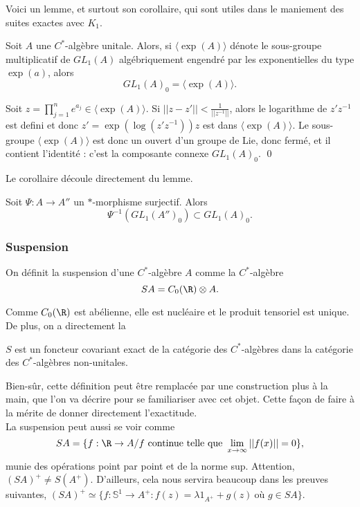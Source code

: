 Voici un lemme, et surtout son corollaire, qui sont utiles dans le maniement des suites exactes avec $K_1$.

\begin{lem}
Soit $A$ une $C^*$-algèbre unitale. Alors, si $\langle \exp(A)\rangle$ dénote le sous-groupe multiplicatif de $GL_1(A)$ algébriquement engendré par les exponentielles du type $\exp(a)$, alors
\[GL_1(A)_0 = \langle \exp(A)\rangle. \]
\end{lem}

\begin{dem}
Soit $z=\prod_{j=1}^n e^{a_j}\in \langle \exp(A)\rangle$. Si $||z-z'||<\frac{1}{||z^{-1}||}$, alors le logarithme de $z'z^{-1}$ est defini et donc 
$z'=\exp(\log(z'z^{-1}) ) z $ est dans $\langle \exp(A)\rangle$. Le sous-groupe $\langle \exp(A)\rangle$ est donc un ouvert d'un groupe de Lie, donc fermé, et il contient l'identité : c'est la composante connexe $GL_1(A)_0$.
\qed
\end{dem}
Le corollaire découle directement du lemme.
\begin{cor} Soit $\Psi : A\rightarrow A''$ un $*$-morphisme surjectif. Alors \[\Psi^{-1}(GL_1(A'')_0)\subset GL_1(A)_0.\]
\end{cor}

\subsubsection{Suspension}
\begin{definition}
On définit la suspension d'une $C^{*}$-algèbre $A$ comme la $C^*$-algèbre 
\[SA = C_0(\R) \otimes A.\]
\end{definition}

Comme $C_0(\R)$ est abélienne, elle est nucléaire et le produit tensoriel est unique. De plus, on a directement la 
\begin{prop}
$S$ est un foncteur covariant exact de la catégorie des $C^*$-algèbres dans la catégorie des $C^*$-algèbres non-unitales.
\end{prop}

Bien-sûr, cette définition peut être remplacée par une construction plus à la main, que l'on va décrire pour se familiariser avec cet objet. Cette façon de faire à la mérite de donner directement l'exactitude.\\
La suspension peut aussi se voir comme 
\[SA = \{f : \R\rightarrow A / f \ \text{continue telle que }\lim_{x\rightarrow \infty}||f(x)||=0\},\]
munie des opérations point par point et de la norme sup. Attention, $(SA)^+\neq S(A^+)$. D'ailleurs, cela nous servira beaucoup dans les preuves suivantes, $(SA)^+ \simeq\{f: \mathbb S^1 \rightarrow A^+ : f(z)=\lambda 1_{A^+}+g(z)\ \text{où }g\in SA \}$.

